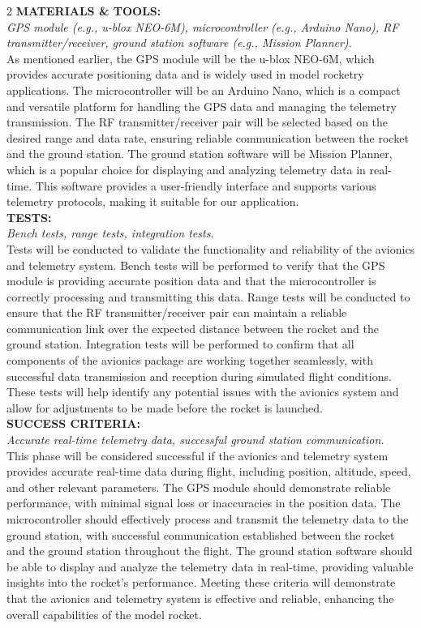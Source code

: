 \documentclass[10pt]{report}
\begin{document}
\begin{multicols}{2}
  \noindent \textbf{\large MATERIALS \& TOOLS:}\\  \textit{GPS module (e.g., u-blox NEO-6M), microcontroller (e.g., Arduino Nano), RF transmitter/receiver, ground station software (e.g., Mission Planner).}\\
  As mentioned earlier, the GPS module will be the u-blox NEO-6M, which provides accurate positioning data and is widely used in model rocketry applications. The microcontroller will be an Arduino Nano, which is a compact and versatile platform for handling the GPS data and managing the telemetry transmission. The RF transmitter/receiver pair will be selected based on the desired range and data rate, ensuring reliable communication between the rocket and the ground station. The ground station software will be Mission Planner, which is a popular choice for displaying and analyzing telemetry data in real-time. This software provides a user-friendly interface and supports various telemetry protocols, making it suitable for our application. \\

  \noindent \textbf{\large TESTS:}\\  \textit{Bench tests, range tests, integration tests.}\\
  Tests will be conducted to validate the functionality and reliability of the avionics and telemetry system. Bench tests will be performed to verify that the GPS module is providing accurate position data and that the microcontroller is correctly processing and transmitting this data. Range tests will be conducted to ensure that the RF transmitter/receiver pair can maintain a reliable communication link over the expected distance between the rocket and the ground station. Integration tests will be performed to confirm that all components of the avionics package are working together seamlessly, with successful data transmission and reception during simulated flight conditions. These tests will help identify any potential issues with the avionics system and allow for adjustments to be made before the rocket is launched. \\

  \noindent \textbf{\large SUCCESS CRITERIA:}\\  \textit{Accurate real-time telemetry data, successful ground station communication.}\\
  This phase will be considered successful if the avionics and telemetry system provides accurate real-time data during flight, including position, altitude, speed, and other relevant parameters. The GPS module should demonstrate reliable performance, with minimal signal loss or inaccuracies in the position data. The microcontroller should effectively process and transmit the telemetry data to the ground station, with successful communication established between the rocket and the ground station throughout the flight. The ground station software should be able to display and analyze the telemetry data in real-time, providing valuable insights into the rocket's performance. Meeting these criteria will demonstrate that the avionics and telemetry system is effective and reliable, enhancing the overall capabilities of the model rocket. \\


\end{multicols}
\end{document}
